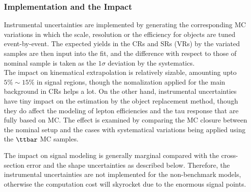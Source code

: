 \subsubsection{Implementation and the Impact} 
Instrumental uncertainties are implemented by generating the corresponding MC variations in which the scale, resolution or the efficiency for objects are tuned event-by-event.
The expected yields in the CRs and SRs (VRs) by the variated samples are then input into the fit, and the difference with respect to those of nominal sample is taken as the $1\sigma$ deviation by the systematics. \\

The impact on kinematical extrapolation is relatively sizable, amounting upto $5\% \sim 15\%$ in signal regions, though the nomalization applied for the main background in CRs helps a lot.
On the other hand, instrumental uncertainties have tiny impact on the estimation by the object replacement method, though they do affect the modeling of lepton efficiencies and the tau response that are fully based on MC.
The effect is examined by comparing the MC closure between the nominal setup and the cases with systematical variations being applied using the $\ttbar$ MC samples. 

The impact on signal modeling is generally marginal compared with the cross-section error and the shape uncertainties as described below.
Therefore, the instrumental uncertainties are not implemented for the non-benchmark models, otherwise the computation cost will skyrocket due to the enormous signal points.


\clearpage
%



\clearpage
